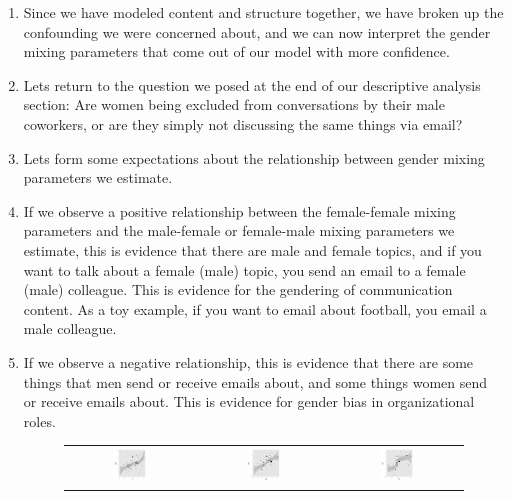 \documentclass[fleqn]{MJDArticle}
\begin{document}
\begin{enumerate}
	\item Since we have modeled content and structure together, we have broken up the confounding we were concerned about, and we can now interpret the gender mixing parameters that come out of our model with more confidence.
	
	\item Lets return to the question we posed at the end of our descriptive analysis section: Are women being excluded from conversations by their male coworkers, or are they simply not discussing the same things via email?
	
	\item  Lets form some expectations about the relationship between gender mixing parameters we estimate. 
	
	\item If we observe a positive relationship between the female-female mixing parameters and the male-female or female-male mixing parameters we estimate, this is evidence that there are male and female topics, and if you want to talk about a female (male) topic, you send an email to a female (male) colleague. This is evidence for the gendering of communication content. As a toy example, if you want to email about football, you email a male colleague.
	
	\item If we observe a negative relationship, this is evidence that there are some things that men send or receive emails about, and some things women send or receive emails about. This is evidence for gender bias in organizational roles.
	
	\begin{figure}[H]
		\begin{tabular}{ccc}
			\includegraphics[width = 0.28\textwidth]{images/FF_FM.pdf} &
			\includegraphics[width = 0.28\textwidth]{images/FF_MF.pdf}&
			\includegraphics[width = 0.28\textwidth]{images/FM_MF.pdf}
		\end{tabular}
	\end{figure}
	

\end{enumerate}
\end{document}
